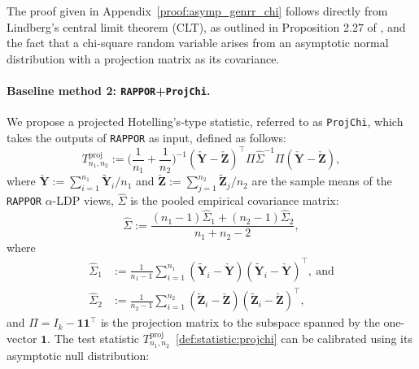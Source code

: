 \documentclass[twoside,11pt]{article}
\newcommand{\vectorize}[1]{\mathbf{#1}}
\newcommand{\rvY}{Y}
\newcommand{\rVecY}{\vectorize{\rvY}}
\newcommand{\rvZ}{Z}
\newcommand{\rVecZ}{\vectorize{\rvZ}}
\newcommand{\alphabetSize}{k} %
\newcommand{\sampleSize}{n}
\newcommand{\privacyParameter}{\alpha} %
\begin{document}
\begin{appendix}
\begin{lemma}
	\end{lemma}
	The proof given in Appendix~\ref{proof:asymp_genrr_chi} follows directly from Lindberg's central limit theorem (CLT), as outlined in Proposition 2.27 of \citet{van_der_vaart_asymptotic_1998}, and the fact that a chi-square random variable arises from an asymptotic normal distribution with a projection matrix as its covariance. 
	
	\paragraph{Baseline method 2: \texttt{RAPPOR}+\texttt{ProjChi}.}
	We propose a projected Hotelling's-type statistic, referred to as \texttt{ProjChi}, which takes the outputs of \texttt{RAPPOR} as input, defined as follows: 
	\begin{equation}\label{def:statistic:projchi}
		T^{\mathrm{proj}}_{\sampleSize_1, \sampleSize_2}
		:=\biggl( \dfrac{1}{\sampleSize_1}+\dfrac{1}{\sampleSize_2} \biggr)^{-1}
		(
		\check{\rVecY} 
		-
		\check{\rVecZ} 
		)^\top
		\Pi
		\hat{\Sigma}^{-1}
		\Pi
		(
		\check{\rVecY} 
		-
		\check{\rVecZ}
		),
	\end{equation}
	where
	$
	\check{\rVecY} 
	:=
	\sum_{i=1}^{n_1}
	\tilde{\rVecY}_i
	/\sampleSize_1$
	and
	$
	\check{\rVecZ} 
	:=
	\sum_{j=1}^{n_2}
	\tilde{\rVecZ}_j
	/\sampleSize_2
	$
	are the sample means of the \texttt{RAPPOR} $\privacyParameter$-LDP views,
	$\hat{\Sigma}$ is the pooled empirical covariance matrix:
	\begin{equation}
		\hat{\Sigma} := \frac{(n_1 - 1) \hat{\Sigma}_1 + (n_2 - 1) \hat{\Sigma}_2 }{n_1 + n_2 - 2},
	\end{equation}
	where
	\begin{align*}
		\hat{\Sigma}_1 &:= \frac{1}{n_1 - 1} \sum_{i=1}^{n_1} (\tilde{\mathbf{Y}}_i - \check{\mathbf{Y}})(\tilde{\mathbf{Y}}_i - \check{\mathbf{Y}})^\top,~\text{and}
		\\
		\hat{\Sigma}_2 &:= \frac{1}{n_2 - 1} \sum_{i=1}^{n_2} (\tilde{\mathbf{Z}}_i - \check{\mathbf{Z}})(\tilde{\mathbf{Z}}_i - \check{\mathbf{Z}})^\top,
	\end{align*}
	and $\Pi = I_\alphabetSize - \mathbf{1} \mathbf{1}^\top$ is the projection matrix to the subspace spanned by the one-vector $\mathbf{1}$.
	The test statistic  $T^{\mathrm{proj}}_{\sampleSize_1, \sampleSize_2}$~\eqref{def:statistic:projchi} can  be calibrated using its asymptotic null distribution:
	

\end{appendix}
\end{document}
